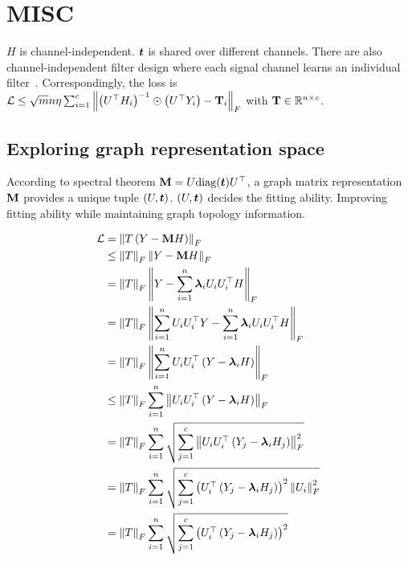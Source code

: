 \documentclass{article} %
\def\vlambda{{\bm\lambda}}
\begin{document}
\newpage

\section{MISC}

$H$ is channel-independent.
${\bm{t}}$ is shared over different channels.
There are also channel-independent filter design where each signal channel learns an individual filter~\citep{yang2022spectrum,JacobiConv,bo2022specformer}.
Correspondingly, the loss is ${\mathcal{L}}\leq\sqrt{m}n\eta\sum_{i=1}^c\left\|\left(U^{\top}H_i\right)^{-1}\odot\left(U^{\top}Y_i\right)-{\mathbf{T}}_i\right\|_F$ with ${\mathbf{T}}\in{\mathbb{R}}^{n\times c}$.

\subsection{Exploring graph representation space}
According to spectral theorem ${\mathbf{M}}=U\mathrm{diag}({\bm{t}})U^{\top}$, a graph matrix representation ${\mathbf{M}}$ provides a unique tuple $(U,{\bm{t}})$.
$(U,{\bm{t}})$ decides the fitting ability.
Improving fitting ability while maintaining graph topology information.

\begin{equation}
	\begin{aligned}
		\gL&=\left\|T\left(Y-\rmM H\right)\right\|_F\\
		&\leq\left\|T\right\|_F\left\|Y-\rmM H\right\|_F\\
		&=\left\|T\right\|_F\left\|Y-\sum_{i=1}^n\vlambda_iU_iU_i^{\top}H\right\|_F\\
		&=\left\|T\right\|_F\left\|\sum_{i=1}^nU_iU_i^{\top}Y-\sum_{i=1}^n\vlambda_iU_iU_i^{\top}H\right\|_F\\
		&=\left\|T\right\|_F\left\|\sum_{i=1}^nU_iU_i^{\top}\left(Y-\vlambda_iH\right)\right\|_F\\
		&\leq\left\|T\right\|_F\sum_{i=1}^n\left\|U_iU_i^{\top}\left(Y-\vlambda_iH\right)\right\|_F\\
		&=\left\|T\right\|_F\sum_{i=1}^n\sqrt{\sum_{j=1}^c\left\|U_iU_i^{\top}\left(Y_j-\vlambda_iH_j\right)\right\|^2_F}\\
		&=\left\|T\right\|_F\sum_{i=1}^n\sqrt{\sum_{j=1}^c\left(U_i^{\top}\left(Y_j-\vlambda_iH_j\right)\right)^2\left\|U_i\right\|^2_F}\\
		&=\left\|T\right\|_F\sum_{i=1}^n\sqrt{\sum_{j=1}^c\left(U_i^{\top}\left(Y_j-\vlambda_iH_j\right)\right)^2}
	\end{aligned}
\end{equation}
\end{document}
